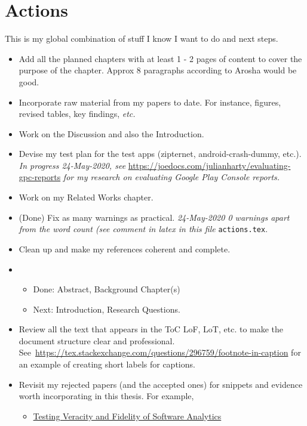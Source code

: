 \section{Actions}
\label{meta-chapter-actions}
This is my global combination of stuff I know I want to do and next steps.
\begin{itemize}
    \item Add all the planned chapters with at least 1 - 2 pages of content to cover the purpose of the chapter. Approx 8 paragraphs according to Arosha would be good.
    \item Incorporate raw material from my papers to date. For instance, figures, revised tables, key findings, \emph{etc.}
    \item Work on the Discussion and also the Introduction.
    \item Devise my test plan for the test apps (zipternet, android-crash-dummy, etc.). \emph{In progress 24-May-2020, see} \url{https://joedocs.com/julianharty/evaluating-gpc-reports} \emph{for my research on evaluating Google Play Console reports.}
    \item Work on my Related Works chapter.
    \item (Done) Fix as many warnings as practical. \emph{24-May-2020 0 warnings apart from the word count (see comment in latex in this file} \texttt{actions.tex}. 
    \item Clean up and make my references coherent and complete.
    \item {}
    \begin{itemize}
        \item Done: Abstract, Background Chapter(s)
        \item Next: Introduction, Research Questions.
    \end{itemize}
    \item Review all the text that appears in the ToC LoF, LoT, etc. to make the document structure clear and professional. See~\url{https://tex.stackexchange.com/questions/296759/footnote-in-caption} for an example of creating short labels for captions.
    \item Revisit my rejected papers (and the accepted ones) for snippets and evidence worth incorporating in this thesis. For example, 
    \begin{itemize}
        \item \href{https://www.overleaf.com/4666349717jtgjwrkchfkh}{Testing Veracity and Fidelity of Software Analytics}
    \end{itemize}
    
\end{itemize}


